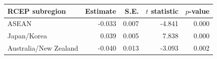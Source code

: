 \begin{tabular}{lrrrr}
\toprule
RCEP subregion & Estimate & S.E. & $t$ statistic & $p$-value \\
\midrule
ASEAN & -0.033 & 0.007 & -4.841 & 0.000 \\
Japan/Korea & 0.039 & 0.005 & 7.838 & 0.000 \\
Australia/New Zealand & -0.040 & 0.013 & -3.093 & 0.002 \\
\bottomrule
\end{tabular}